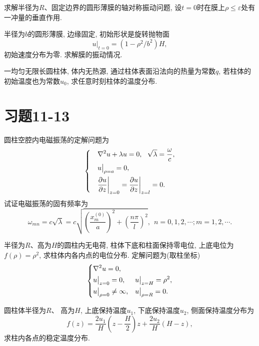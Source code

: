 \begin{yyEx}
	求解半径为$R$、固定边界的圆形薄膜的轴对称振动问题, 设$t = 0$时在膜上$\rho\leqslant\varepsilon$处有一冲量的垂直作用.
\end{yyEx}

\begin{yyEx}
	半径为$b$的圆形薄膜, 边缘固定, 初始形状是旋转抛物面\begin{equation*}
	u\big|_{t = 0} = (1-\rho^2/b^2)H,
	\end{equation*}
	初始速度分布为零. 求解膜的振动情况.
\end{yyEx}

\begin{yyEx}
	一均匀无限长圆柱体, 体内无热源, 通过柱体表面沿法向的热量为常数$q$, 若柱体的初始温度也为常数$u_0$, 求任意时刻柱体的温度分布.
\end{yyEx}

\section{习题11-13}

\begin{yyEx}
	圆柱空腔内电磁振荡的定解问题为\begin{equation*}
		\begin{dcases}
			&\nabla^2u + \lambda u = 0,~~\sqrt{\lambda} = \frac{\omega}{c},\\
			&u\big|_{\rho = a} = 0,\\
			&\frac{\partial u}{\partial z}\bigg|_{z = 0} = \frac{\partial u}{\partial z}\bigg|_{z = l} = 0. 
		\end{dcases}
	\end{equation*}
	试证电磁振荡的固有频率为\begin{equation*}
		\omega_{mn} = c\sqrt{\lambda} = c\sqrt{\left( \frac{x_m^{(0)}}{a} \right)^2 + \left( \frac{n\pi}{l} \right)^2},~~n = 0,1,2,\cdots;m = 1,2,\cdots.
	\end{equation*}
\end{yyEx}

\begin{yyEx}
	半径为$R$、高为$H$的圆柱内无电荷, 柱体下底和柱面保持零电位, 上底电位为$f(\rho) = \rho^2$, 求柱体内各内点的电位分布. 定解问题为(取柱坐标)\begin{equation*}
		\begin{dcases}
			\nabla^2u = 0,&~\\
			u\big|_{z = 0} = 0,&u\big|_{z = H} = \rho^2,\\
			u\big|_{\rho = 0} \neq \infty,&u\big|_{\rho = R} = 0.
		\end{dcases}
	\end{equation*}
\end{yyEx}

\begin{yyEx}
	圆柱体半径为$R$、 高为$H$, 上底保持温度$u_1$, 下底保持温度$u_2$, 侧面保持温度分布为
	\begin{equation*}
		f(z) = \frac{2u_1}{H}\left( z-\frac{H}{2} \right)z+\frac{2u_2}{H}\left( H-z \right),
	\end{equation*}
	求柱内各点的稳定温度分布.
\end{yyEx}
